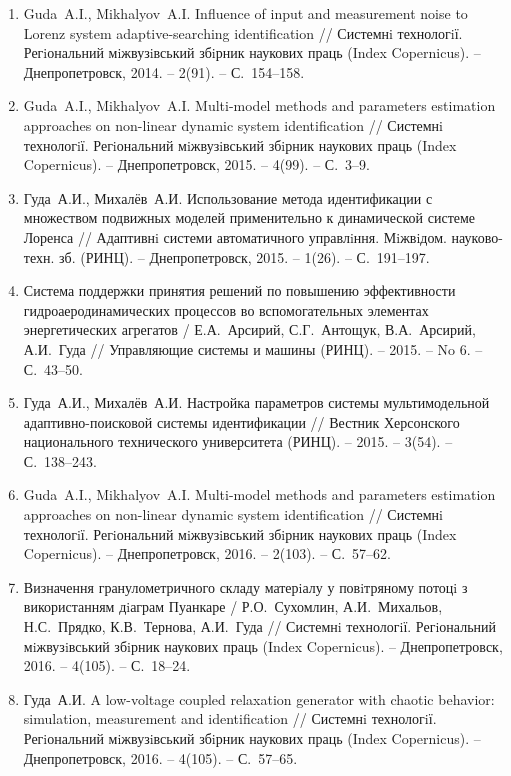 \begin{enumerate}
\item
Guda~A.I., Mikhalyov~A.I. Influence of input and measurement noise to Lorenz system
adaptive-searching identification // Системнi технологiї. Регiональний мiжвузiвський
збiрник наукових праць (Index Copernicus). -- Днепропетровск, 2014. -- 2(91). -- С.~154--158.

\item
Guda~A.I., Mikhalyov~A.I. Multi-model methods and parameters estimation approaches
on non-linear dynamic system identification //
Системнi технологiї. Регiональний мiжвузiвський збiрник наукових праць (Index Copernicus).
 -- Днепропетровск, 2015. -- 4(99). -- С.~3--9.

\item
Гуда~А.И., Михалёв~А.И. Использование метода идентификации с множеством
подвижных моделей применительно к динамической системе Лоренса
// Адаптивнi системи автоматичного управлiння. Мiжвiдом. науково-техн. зб. (РИНЦ).
-- Днепропетровск, 2015. -- 1(26). -- С.~191--197.

\item
Система поддержки принятия решений по повышению эффективности гидроаеродинамических
процессов во вспомогательных элементах энергетических агрегатов /
Е.А.~Арсирий, С.Г.~Антощук, В.А.~Арсирий, А.И.~Гуда // Управляющие системы и машины (РИНЦ).
-- 2015. -- No 6. -- С.~43--50.

\item
Гуда~А.И., Михалёв~А.И. Настройка параметров системы мультимодельной
адаптивно-поисковой системы идентификации
// Вестник Херсонского национального технического университета (РИНЦ). -- 2015. -- 3(54). -- С.~138--243.

\item
Guda~A.I., Mikhalyov~A.I. Multi-model methods and parameters estimation approaches
on non-linear dynamic system identification // Системнi технологiї. Регiональний мiжвузiвський
збiрник наукових праць (Index Copernicus). -- Днепропетровск, 2016. -- 2(103). -- С.~57--62.

\item
Визначення гранулометричного складу матерiалу у повiтряному потоцi з використанням дiаграм Пуанкаре
/ Р.О.~Сухомлин, А.И.~Михальов, Н.С.~Прядко, К.В.~Тернова, А.И.~Гуда
// Системнi технологiї. Регiональний мiжвузiвський збiрник наукових праць (Index Copernicus).
-- Днепропетровск, 2016. -- 4(105). -- С.~18--24.

\item
Гуда~А.И. A low-voltage coupled relaxation generator with chaotic behavior: simulation,
measurement and identification // Системнi технологiї. Регiональний мiжвузiвський
збiрник наукових праць (Index Copernicus). -- Днепропетровск, 2016. -- 4(105). -- С.~57--65.


\end{enumerate}
